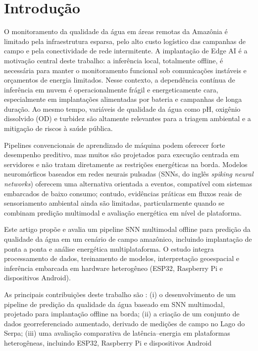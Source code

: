 \section{Introdução}

O monitoramento da qualidade da água em áreas remotas da Amazônia é limitado pela infraestrutura esparsa, pelo alto custo logístico das campanhas de campo e pela conectividade de rede intermitente. A implantação de Edge AI é a motivação central deste trabalho: a inferência local, totalmente offline, é necessária para manter o monitoramento funcional sob comunicações instáveis e orçamentos de energia limitados. Nesse contexto, a dependência contínua de inferência em nuvem é operacionalmente frágil e energeticamente cara, especialmente em implantações alimentadas por bateria e campanhas de longa duração. Ao mesmo tempo, variáveis de qualidade da água como pH, oxigênio dissolvido (OD) e turbidez são altamente relevantes para a triagem ambiental e a mitigação de riscos à saúde pública.

Pipelines convencionais de aprendizado de máquina podem oferecer forte desempenho preditivo, mas muitos são projetados para execução centrada em servidores e não tratam diretamente as restrições energéticas na borda. Modelos neuromórficos baseados em redes neurais pulsadas (SNNs, do inglês \textit{spiking neural networks}) oferecem uma alternativa orientada a eventos, compatível com sistemas embarcados de baixo consumo; contudo, evidências práticas em fluxos reais de sensoriamento ambiental ainda são limitadas, particularmente quando se combinam predição multimodal e avaliação energética em nível de plataforma.

Este artigo propõe e avalia um pipeline SNN multimodal offline para predição da qualidade da água em um cenário de campo amazônico, incluindo implantação de ponta a ponta e análise energética multiplataforma. O estudo integra processamento de dados, treinamento de modelos, interpretação geoespacial e inferência embarcada em hardware heterogêneo (ESP32, Raspberry Pi e dispositivos Android).

As principais contribuições deste trabalho são : (i) o desenvolvimento de um pipeline de predição da qualidade da água baseado em SNN multimodal, projetado para implantação offline na borda; (ii) a criação de um conjunto de dados georreferenciado aumentado, derivado de medições de campo no Lago do Serpa; (iii) uma avaliação comparativa de latência--energia em plataformas heterogêneas, incluindo ESP32, Raspberry Pi e dispositivos Android
